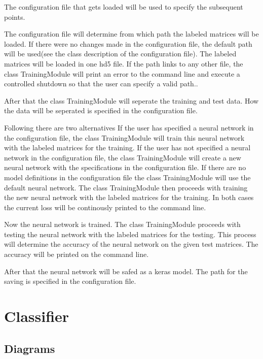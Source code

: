 \documentclass[parskip=full]{scrartcl}
\begin{document}
The configuration file that gets loaded will be used to specify the subsequent points.\newline

The configuration file will determine from which path the labeled matrices will be loaded.
If there were no changes made in the configuration file, the default path will be used(see the class description of the configuration file).
The labeled matrices will be loaded in one hd5 file. If the path links to any other file, the class TrainingModule will print an error to the command line and execute a controlled shutdown so that the user can specify a valid path.. \newline

After that the class TrainingModule will seperate the training and test data.
How the data will be seperated is specified in the configuration file.\newline

Following there are two alternatives
 If the user has specified a neural network in the configuration file, the class TrainingModule will train this neural network with the labeled matrices for the training.
If the user has not specified a neural network in the configuration file, the class TrainingModule will create a new neural network with the specifications in the configuration file.
If there are no model definitions in the configuration file the class TrainingModule will use the \gls{default neural network}.
The class TrainingModule then proceeds with training the new neural network with the labeled matrices for the training. In both cases the current loss will be continously printed to the command line.\newline

Now the neural network is trained. The class TrainingModule proceeds with testing the neural network with the labeled matrices for the testing.
This process will determine the accuracy of the neural network on the given test matrices.
The accuracy will be printed on the command line.\newline

After that the neural network will be safed as a keras model.
The path for the saving is specified in the configuration file.


\newpage
\section{Classifier}

\subsection{Diagrams}
\end{document}
